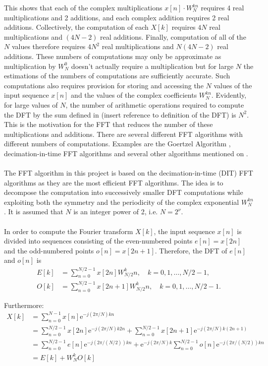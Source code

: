 This shows that each of the complex multiplications $x[n] \cdot W_N^{kn}$ requires 4 real multiplications and 2 additions, and each complex addition requires 2 real additions. Collectively, the computation of each $X[k]$ requires $4N$ real multiplications and $(4N-2)$ real additions. Finally, computation of all of the $N$ values therefore requires $4N^2$ real multiplications and $N(4N-2)$ real additions. These numbers of computations may only be approximate as multiplication by $W_N^0$ doesn't actually require a multiplication but for large $N$ the estimations of the numbers of computations are sufficiently accurate. Such computations also requires provision for storing and accessing the $N$ values of the input sequence $x[n]$ and the values of the complex coefficients $W_N^{kn}$. Evidently, for large values of $N$, the number of arithmetic operations required to compute the DFT by the sum defined in (insert reference to definition of the DFT) is $N^2$. This is the motivation for the FFT that reduces the number of these multiplications and additions. There are several different FFT algorithms with different numbers of computations. Examples are the Goertzel Algorithm \cite{page 751, DTSP}, decimation-in-time FFT algorithms \cite{page 755, DTSP} and several other algorithms mentioned on \cite{pages 306-307, FSP}.
\\ \\
The FFT algorithm in this project is based on the decimation-in-time (DIT) FFT algorithms as they are the most efficient FFT algorithms. The idea is to decompose the computation into successively smaller DFT computations while exploiting both the symmetry and the periodicity of the complex exponential $W_N^{kn}$ \cite{page 755, DTSP}. It is assumed that $N$ is an integer power of 2, i.e. $N = 2^\nu$.
\\ \\
In order to compute the Fourier transform $X[k]$, the input sequence $x[n]$ is divided into sequences consisting of the even-numbered points $e[n] = x[2n]$ and the odd-numbered points $o[n] = x[2n+1]$. Therefore, the DFT of $e[n]$ and $o[n]$ is
\begin{align*}
E[k] &= \sum_{n=0}^{N/2-1} x[2n] W_{N/2}^kn, \quad k = 0, 1, \dots, N/2-1, \\
O[k] &= \sum_{n=0}^{N/2-1} x[2n+1] W_{N/2}^kn, \quad k = 0, 1, \dots, N/2-1.
\end{align*}

Furthermore:
\begin{align}
X[k] &= \sum_{n=0}^{N-1} x[n] \text{e}^{-j(2\pi/N)kn} \nonumber \\
&= \sum_{n=0}^{N/2-1} x[2n] \text{e}^{-j(2\pi/N)k2n} + \sum_{n=0}^{N/2-1} x[2n+1] \text{e}^{-j(2\pi/N)k(2n+1)} \nonumber \\
&= \sum_{n=0}^{N/2-1} e[n] \text{e}^{-j(2\pi/(N/2))kn} + \text{e}^{-j(2\pi/N)k} \sum_{n=0}^{N/2-1} o[n] \text{e}^{-j(2\pi/(N/2))kn} \nonumber \\
&= E[k] + W_N^k O[k] \label{FFT_DIT}
\end{align}


